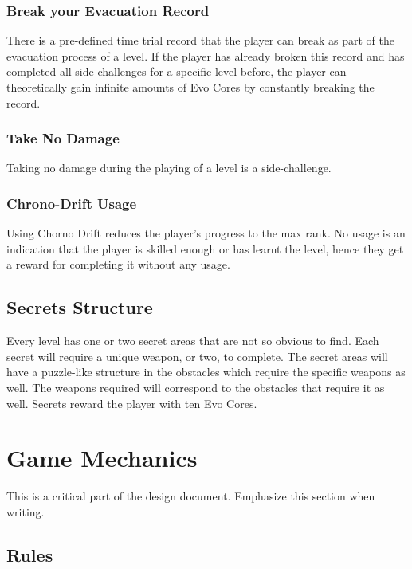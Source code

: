 \documentclass[12pt]{article}
\begin{document}
\subsubsection{Break your Evacuation Record}

There is a pre-defined time trial record that the player can break as part of the evacuation process of a level. If the player has already broken this record and has completed all side-challenges for a specific level before, the player can theoretically gain infinite amounts of Evo Cores by constantly breaking the record. 

\subsubsection{Take No Damage}

Taking no damage during the playing of a level is a side-challenge. 

\subsubsection{Chrono-Drift Usage}

Using Chorno Drift reduces the player's progress to the max rank. No usage is an indication that the player is skilled enough or has learnt the level, hence they get a reward for completing it without any usage. 

\subsection{Secrets Structure}

Every level has one or two secret areas that are not so obvious to find. Each secret will require a unique weapon, or two, to complete. The secret areas will have a puzzle-like structure in the obstacles which require the specific weapons as well. The weapons required will correspond to the obstacles that require it as well. Secrets reward the player with ten Evo Cores.

\section{Game Mechanics}

This is a critical part of the design document. Emphasize this section when writing.

\subsection{Rules}
\end{document}
